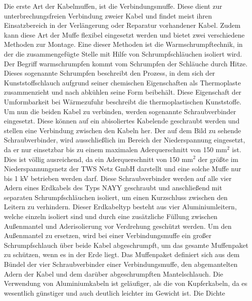 Die erste Art der Kabelmuffen, ist die Verbindungsmuffe. Diese dient zur unterbrechungsfreien Verbindung zweier Kabel und findet meist ihren Einsatzbereich 
in der Verlängerung oder Reparatur vorhandener Kabel. Zudem kann diese Art der Muffe flexibel eingesetzt werden und bietet zwei verschiedene Methoden zur 
Montage. Eine dieser Methoden ist die Warmschrumpftechnik, in der die zusammengefügte Stelle mit Hilfe von Schrumpfschläuchen isoliert wird. Der Begriff 
warmschrumpfen kommt vom Schrumpfen der Schläuche durch Hitze. Dieses sogenannte Schrumpfen beschreibt den Prozess, in dem sich der Kunststoffschlauch 
aufgrund seiner chemischen Eigenschaften als Thermoplaste zusammenzieht und nach abkühlen seine Form beibehält. Diese Eigenschaft der Umformbarkeit bei 
Wärmezufuhr beschreibt die thermoplastischen Kunststoffe. Um nun die beiden Kabel zu verbinden, werden sogenannte Schraubverbinder eingesetzt. Diese können 
auf ein abisoliertes Kabelende geschraubt werden und stellen eine Verbindung zwischen den Kabeln her.
Der auf dem Bild zu sehende Schraubverbinder, wird ausschließlich im Bereich der Niederspannung eingesetzt, da er nur einsetzbar bis zu einem maximalen 
Aderquerschnitt von 150 $\text{mm}^2$ ist. Dies ist völlig ausreichend, da ein Aderquerschnitt von 150 $\text{mm}^2$ der größte im Niederspannungsnetz der 
TWS Netz GmbH darstellt und eine solche Muffe nur bis 1 kV betrieben werden darf. Diese Schraubverbinder werden auf alle vier Adern eines Erdkabels des 
Typs NAYY geschraubt und anschließend mit separaten Schrumpfschläuchen isoliert, um einen Kurzschluss zwischen den Leitern zu verhindern. Dieser Erdkabeltyp 
besteht aus vier Aluminiumleitern, welche einzeln isoliert sind und durch eine zusätzliche Füllung zwischen Außenmantel und Aderisolierung vor Verdrehung 
geschützt werden.%
Um den Außenmantel zu ersetzen, wird bei einer Verbindungsmuffe ein großer Schrumpfschlauch über beide Kabel abgeschrumpft, um das gesamte Muffenpaket zu 
schützen, wenn es in der Erde liegt. Das Muffenpaket definiert sich aus dem Bündel der vier Schraubverbinder einer Verbindungsmuffe, den abgemantelten 
Adern der Kabel und dem darüber abgeschrumpften Mantelschlauch. %
Die Verwendung von Aluminiumkabeln ist geläufiger, als die von Kupferkabeln, da es wesentlich günstiger und auch deutlich leichter im Gewicht ist. Die Dichte 
